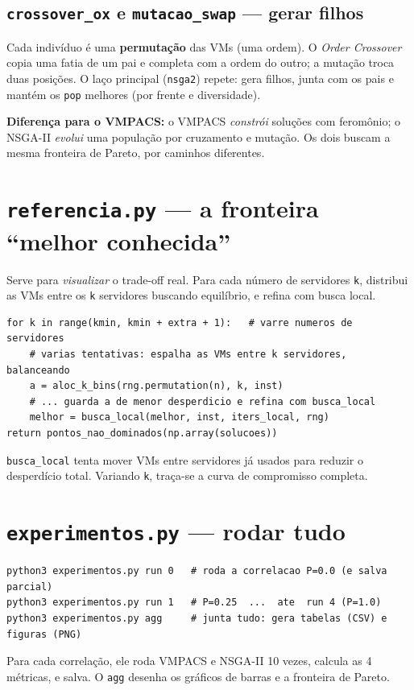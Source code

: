 \documentclass[11pt]{article}
\begin{document}
\subsection{\texttt{crossover\_ox} e \texttt{mutacao\_swap} --- gerar filhos}
Cada indivíduo é uma \textbf{permutação} das VMs (uma ordem). O \emph{Order
Crossover} copia uma fatia de um pai e completa com a ordem do outro; a mutação
troca duas posições. O laço principal (\texttt{nsga2}) repete: gera filhos, junta
com os pais e mantém os \texttt{pop} melhores (por frente e diversidade).

\begin{ideia}
\textbf{Diferença para o VMPACS:} o VMPACS \emph{constrói} soluções com feromônio;
o NSGA-II \emph{evolui} uma população por cruzamento e mutação. Os dois buscam a
mesma fronteira de Pareto, por caminhos diferentes.
\end{ideia}

\section{\texttt{referencia.py} --- a fronteira ``melhor conhecida''}
Serve para \emph{visualizar} o trade-off real. Para cada número de servidores
\texttt{k}, distribui as VMs entre os \texttt{k} servidores buscando equilíbrio, e
refina com busca local.
\begin{lstlisting}
for k in range(kmin, kmin + extra + 1):   # varre numeros de servidores
    # varias tentativas: espalha as VMs entre k servidores, balanceando
    a = aloc_k_bins(rng.permutation(n), k, inst)
    # ... guarda a de menor desperdicio e refina com busca_local
    melhor = busca_local(melhor, inst, iters_local, rng)
return pontos_nao_dominados(np.array(solucoes))
\end{lstlisting}
\texttt{busca\_local} tenta mover VMs entre servidores já usados para reduzir o
desperdício total. Variando \texttt{k}, traça-se a curva de compromisso completa.

\section{\texttt{experimentos.py} --- rodar tudo}
\begin{lstlisting}
python3 experimentos.py run 0   # roda a correlacao P=0.0 (e salva parcial)
python3 experimentos.py run 1   # P=0.25  ...  ate  run 4 (P=1.0)
python3 experimentos.py agg     # junta tudo: gera tabelas (CSV) e figuras (PNG)
\end{lstlisting}
Para cada correlação, ele roda VMPACS e NSGA-II 10 vezes, calcula as 4 métricas,
e salva. O \texttt{agg} desenha os gráficos de barras e a fronteira de Pareto.
\end{document}
